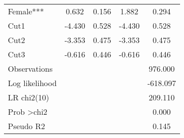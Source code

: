 \begin{table}[H]
\begin{tabular}{lcccc}
Female***                 & 0.632  & 0.156 & 1.882  & 0.294    \\
Cut1                     & -4.430 & 0.528 & -4.430 & 0.528    \\
Cut2                     & -3.353 & 0.475 & -3.353 & 0.475    \\
Cut3                     & -0.616 & 0.446 & -0.616 & 0.446    \\
Observations              &        &       &        & 976.000  \\ 
\midrule
Log likelihood            &        &       &        & -618.097 \\
LR chi2(10)               &        &       &        & 209.110  \\
Prob \textgreater chi2    &        &       &        & 0.000    \\
Pseudo R2                 &        &       &        & 0.145    \\
\bottomrule
\end{tabular}
\end{table}